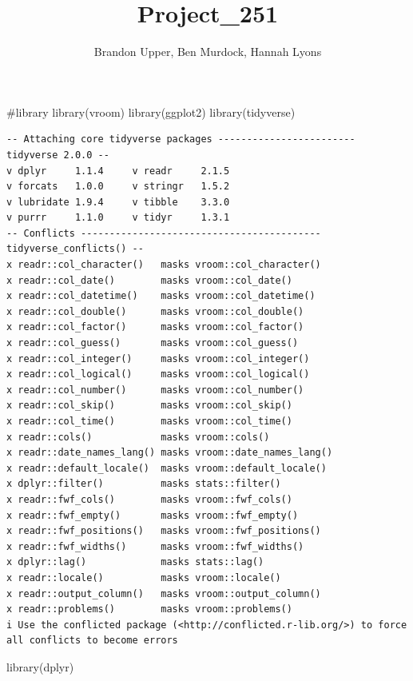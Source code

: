 \documentclass[
  letterpaper,
  DIV=11,
  numbers=noendperiod]{scrartcl}
\title{Project\_251}
\author{Brandon Upper, Ben Murdock, Hannah Lyons}
\date{}
\newenvironment{Shaded}{\begin{snugshade}}{\end{snugshade}}
\newcommand{\CommentTok}[1]{\textcolor[rgb]{0.37,0.37,0.37}{#1}}
\newcommand{\FunctionTok}[1]{\textcolor[rgb]{0.28,0.35,0.67}{#1}}
\newcommand{\NormalTok}[1]{\textcolor[rgb]{0.00,0.23,0.31}{#1}}
\begin{document}
\maketitle


\begin{Shaded}
\begin{Highlighting}[]
\CommentTok{\#library}
\FunctionTok{library}\NormalTok{(vroom)}
\FunctionTok{library}\NormalTok{(ggplot2)}
\FunctionTok{library}\NormalTok{(tidyverse)}
\end{Highlighting}
\end{Shaded}

\begin{verbatim}
-- Attaching core tidyverse packages ------------------------ tidyverse 2.0.0 --
v dplyr     1.1.4     v readr     2.1.5
v forcats   1.0.0     v stringr   1.5.2
v lubridate 1.9.4     v tibble    3.3.0
v purrr     1.1.0     v tidyr     1.3.1
-- Conflicts ------------------------------------------ tidyverse_conflicts() --
x readr::col_character()   masks vroom::col_character()
x readr::col_date()        masks vroom::col_date()
x readr::col_datetime()    masks vroom::col_datetime()
x readr::col_double()      masks vroom::col_double()
x readr::col_factor()      masks vroom::col_factor()
x readr::col_guess()       masks vroom::col_guess()
x readr::col_integer()     masks vroom::col_integer()
x readr::col_logical()     masks vroom::col_logical()
x readr::col_number()      masks vroom::col_number()
x readr::col_skip()        masks vroom::col_skip()
x readr::col_time()        masks vroom::col_time()
x readr::cols()            masks vroom::cols()
x readr::date_names_lang() masks vroom::date_names_lang()
x readr::default_locale()  masks vroom::default_locale()
x dplyr::filter()          masks stats::filter()
x readr::fwf_cols()        masks vroom::fwf_cols()
x readr::fwf_empty()       masks vroom::fwf_empty()
x readr::fwf_positions()   masks vroom::fwf_positions()
x readr::fwf_widths()      masks vroom::fwf_widths()
x dplyr::lag()             masks stats::lag()
x readr::locale()          masks vroom::locale()
x readr::output_column()   masks vroom::output_column()
x readr::problems()        masks vroom::problems()
i Use the conflicted package (<http://conflicted.r-lib.org/>) to force all conflicts to become errors
\end{verbatim}

\begin{Shaded}
\begin{Highlighting}[]
\FunctionTok{library}\NormalTok{(dplyr)}
\end{Highlighting}
\end{Shaded}
\end{document}
